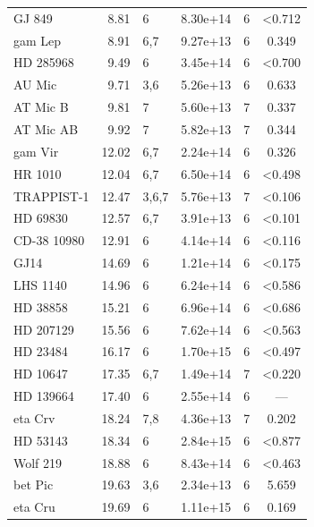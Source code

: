 \documentclass{openjournal}
\begin{document}
\begin{table}
\begin{tabular}{@{}lrlrlc@{}}
GJ 849 & 8.81 & 6 & 8.30e+14 & 6 & <0.712 \\
gam Lep & 8.91 & 6,7 & 9.27e+13 & 6 & 0.349 \\
HD 285968 & 9.49 & 6 & 3.45e+14 & 6 & <0.700 \\
AU Mic & 9.71 & 3,6 & 5.26e+13 & 6 & 0.633 \\
AT Mic B & 9.81 & 7 & 5.60e+13 & 7 & 0.337 \\
AT Mic AB & 9.92 & 7 & 5.82e+13 & 7 & 0.344 \\
gam Vir & 12.02 & 6,7 & 2.24e+14 & 6 & 0.326 \\
HR 1010 & 12.04 & 6,7 & 6.50e+14 & 6 & <0.498 \\
TRAPPIST-1 & 12.47 & 3,6,7 & 5.76e+13 & 7 & <0.106 \\
HD 69830 & 12.57 & 6,7 & 3.91e+13 & 6 & <0.101 \\
CD-38 10980 & 12.91 & 6 & 4.14e+14 & 6 & <0.116 \\
GJ14 & 14.69 & 6 & 1.21e+14 & 6 & <0.175 \\
LHS 1140 & 14.96 & 6 & 6.24e+14 & 6 & <0.586 \\
HD 38858 & 15.21 & 6 & 6.96e+14 & 6 & <0.686 \\
HD 207129 & 15.56 & 6 & 7.62e+14 & 6 & <0.563 \\
HD 23484 & 16.17 & 6 & 1.70e+15 & 6 & <0.497 \\
HD 10647 & 17.35 & 6,7 & 1.49e+14 & 7 & <0.220 \\
HD 139664 & 17.40 & 6 & 2.55e+14 & 6 & --- \\
eta Crv & 18.24 & 7,8 & 4.36e+13 & 7 & 0.202 \\
HD 53143 & 18.34 & 6 & 2.84e+15 & 6 & <0.877 \\
Wolf  219 & 18.88 & 6 & 8.43e+14 & 6 & <0.463 \\
bet Pic & 19.63 & 3,6 & 2.34e+13 & 6 & 5.659 \\
eta Cru & 19.69 & 6 & 1.11e+15 & 6 & 0.169 \\
\hline
\end{tabular}
\end{table}
\end{document}
